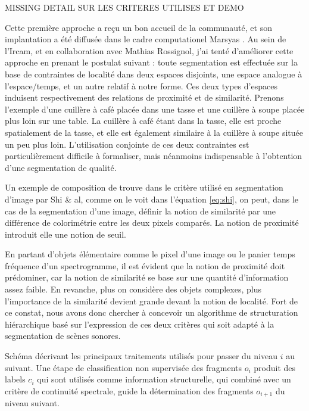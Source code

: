 MISSING DETAIL SUR LES CRITERES UTILISES ET DEMO


Cette première approche a reçu un bon accueil de la communauté\cite{conf, lagrangeTaslp08}, et son implantation a été diffusée dans le cadre computationel Marsyas \cite{}. Au sein de l'Ircam, et en collaboration avec Mathias Rossignol, j'ai tenté d'améliorer cette approche en prenant le postulat suivant : toute segmentation est effectuée sur la base de contraintes de localité dans deux espaces disjoints, une espace analogue à l'espace/temps, et un autre relatif à notre forme. Ces deux types d'espaces induisent respectivement des relations de proximité et de similarité. Prenons l'exemple d'une cuillère à café placée dans une tasse et une cuillère à soupe placée plus loin sur une table. La cuillère à café étant dans la tasse, elle est proche spatialement de la tasse, et elle est également similaire à la cuillère à soupe située un peu plus loin. L'utilisation conjointe de ces deux contraintes est particulièrement difficile à formaliser, mais néanmoins indispensable à l'obtention d'une segmentation de qualité.

Un exemple de composition de trouve dans le critère utilisé en segmentation d'image par Shi \& al, comme on le voit dans l'équation \ref{eq:shi}, on peut, dans le cas de la segmentation d'une image, définir la notion de similarité par une différence de colorimétrie entre les deux pixels comparés. La notion de proximité introduit elle une notion de seuil.

En partant d'objets élémentaire comme le pixel d'une image ou le panier temps fréquence d'un spectrogramme, il est évident que la notion de proximité doit prédominer, car la notion de similarité se base sur une quantité d'information assez faible.  En revanche, plus on considère des objets complexes, plus l'importance de la similarité devient grande devant la notion de localité. Fort de ce constat, nous avons donc chercher à concevoir un algorithme de structuration hiérarchique basé sur l'expression de ces deux critères qui soit adapté à la segmentation de scènes sonores\cite{rossignolhal-01122006}.


Schéma décrivant les principaux traitements utilisés pour passer du niveau $i$ au suivant. Une étape de classification non supervisée des fragments $o_i$ produit des labels $c_i$ qui sont utilisés comme information structurelle, qui combiné avec un critère de continuité spectrale, guide la détermination des fragments $o_{i+1}$ du niveau suivant.

